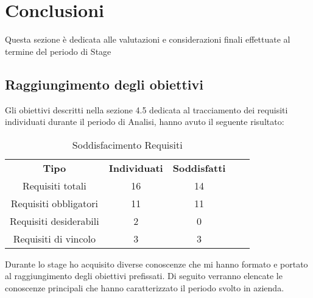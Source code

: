 
\chapter{Conclusioni}
\label{cap:conclusioni}
Questa sezione è dedicata alle valutazioni e considerazioni finali effettuate
al termine del periodo di Stage
\section{Raggiungimento degli obiettivi}
Gli obiettivi descritti nella sezione 4.5 dedicata al tracciamento dei requisiti
individuati durante il periodo di Analisi, hanno avuto il seguente risultato:
\begin{center}
	\begin{table}[h]
		\centering
		\begin{tabular}{|c|c|c|ll}
			\cline{1-3}
			\textbf{Tipo}          & \textbf{Individuati} & \textbf{Soddisfatti} &  &  \\ \cline{1-3}
			Requisiti totali       & 16                   & 14                   &  &  \\
			\cline{1-3}
			Requisiti obbligatori & 11                    & 11                    &  &  \\
			\cline{1-3}
			Requisiti desiderabili & 2                    & 0                    &  &  \\ \cline{1-3}
			Requisiti di vincolo   & 3                    & 3                    &  &  \\ \cline{1-3}
		\end{tabular}
	\caption{Soddisfacimento Requisiti}
	\end{table}
	\label{tab:Soddisfacimento Requisiti}

\end{center}
	Durante lo stage ho acquisito diverse conoscenze che mi hanno formato
e portato al raggiungimento degli obiettivi prefissati. Di seguito verranno
elencate le conoscenze principali che hanno caratterizzato il periodo svolto
in azienda.
